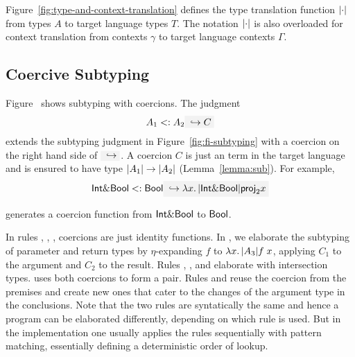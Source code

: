 Figure~\ref{fig:type-and-context-translation} defines the type translation
function $\lvert \cdot \rvert$ from \name types $A$ to target language types $T$. The
notation $\lvert \cdot \rvert$ is also overloaded for context translation from \name
contexts $\gamma$ to target language contexts $\Gamma$.


\subsection{Coercive Subtyping}

Figure~ shows subtyping with coercions. The judgment
\[
A_1 \subtype A_2 \yields C
\]
extends the subtyping judgment in Figure~\ref{fig:fi-subtyping} with a coercion
on the right hand side of $ \yields {} $. A coercion $ C $ is just an term
in the target language and is ensured to have type
$ \lvert A_1 \rvert \to \lvert A_2 \rvert $ (Lemma~\ref{lemma:sub}). For example,
\[
\tyint \inter \tybool \subtype \tybool \yields {\lam x {\im {\tyint \inter \tybool}} {\proj 2 x}}
\]

\noindent generates a coercion function from $\textsf{Int} \& \textsf{Bool}$ to $\textsf{Bool}$.

In rules , , ,
coercions are just identity functions. In , we elaborate the
subtyping of parameter and return types by $\eta$-expanding $f$ to
$\lambda x.\, \lvert A_3 \rvert {f \; x}$, applying $C_1$ to the argument and $C_2$ to
the result. Rules , , and
 elaborate with intersection types.  uses
both coercions to form a pair. Rules  and
 reuse the coercion from the premises and create new ones
that cater to the changes of the argument type in the conclusions. Note that the
two rules are syntatically the same and hence a program can be elaborated
differently, depending on which rule is used. But in the implementation one
usually applies the rules sequentially with pattern matching, essentially
defining a deterministic order of lookup.
\begin{comment}
if we know $A_1$ is a subtype of $A_3$ and $C$ is a coercion from $A_1$
to $A_3$, then we can conclude that $A_1 \inter A_2$ is also a subtype
of $A_3$ and the new coercion is a function that takes a value $ x $ of type
$A_1\inter A_2$, project $x$ on the first item, and apply $ C $ to it.
\end{comment}

